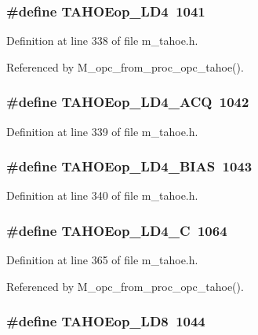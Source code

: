 \subsubsection{\setlength{\rightskip}{0pt plus 5cm}\#define TAHOEop\_\-LD4~1041}\label{m__tahoe_8h_d31ddc64437239e8dcee5459900eecd8}




Definition at line 338 of file m\_\-tahoe.h.

Referenced by M\_\-opc\_\-from\_\-proc\_\-opc\_\-tahoe().
\subsubsection{\setlength{\rightskip}{0pt plus 5cm}\#define TAHOEop\_\-LD4\_\-ACQ~1042}\label{m__tahoe_8h_da8cc962d2f61f665cd100b4f51fda44}




Definition at line 339 of file m\_\-tahoe.h.
\subsubsection{\setlength{\rightskip}{0pt plus 5cm}\#define TAHOEop\_\-LD4\_\-BIAS~1043}\label{m__tahoe_8h_b132fd7a7da19326b19686292a1a367f}




Definition at line 340 of file m\_\-tahoe.h.
\subsubsection{\setlength{\rightskip}{0pt plus 5cm}\#define TAHOEop\_\-LD4\_\-C~1064}\label{m__tahoe_8h_bc7ee8fac6f8c0777e49c043ac3498c7}




Definition at line 365 of file m\_\-tahoe.h.

Referenced by M\_\-opc\_\-from\_\-proc\_\-opc\_\-tahoe().
\subsubsection{\setlength{\rightskip}{0pt plus 5cm}\#define TAHOEop\_\-LD8~1044}\label{m__tahoe_8h_89c84f887ae5819d9821ad95310e3a6a}




